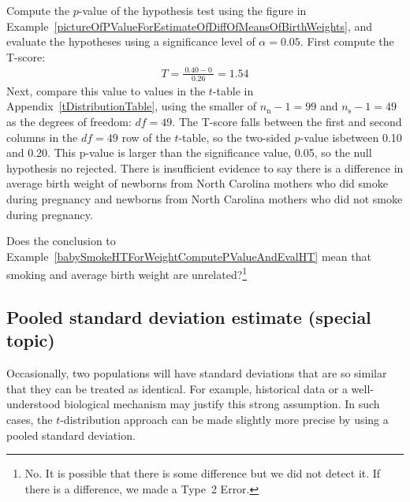\begin{example}{Compute the $p$-value of the hypothesis test using the figure in Example~\ref{pictureOfPValueForEstimateOfDiffOfMeansOfBirthWeights}, and evaluate the hypotheses using a significance level of $\alpha=0.05$.} \label{babySmokeHTForWeightComputePValueAndEvalHT}
First compute the T-score:
\begin{eqnarray*}
T = \frac{\ 0.40 - 0\ }{0.26} = 1.54
\end{eqnarray*}
Next, compare this value to values in the $t$-table in Appendix~\vref{tDistributionTable}, using the smaller of $n_{\text{n}} - 1 = 99$ and $n_{\text{s}} - 1 = 49$ as the degrees of freedom: $df = 49$. The T-score falls between the first and second columns in the $df = 49$ row of the $t$-table, so the two-sided $p$-value isbetween 0.10 and 0.20. This p-value is larger than the significance value, 0.05, so the null hypothesis no rejected. There is insufficient evidence to say there is a difference in average birth weight of newborns from North Carolina mothers who did smoke during pregnancy and newborns from North Carolina mothers who did not smoke during pregnancy.
\end{example}

\begin{exercise}
Does the conclusion to Example~\ref{babySmokeHTForWeightComputePValueAndEvalHT} mean that smoking and average birth weight are unrelated?\footnote{No. It is possible that there is some difference but we did not detect it. If there is a difference, we made a Type~2 Error.}
\end{exercise}

\subsection{Pooled standard deviation estimate (special topic)}
\label{pooledStandardDeviations}

Occasionally, two populations will have standard deviations that are so similar that they can be treated as identical. For example, historical data or a well-understood biological mechanism may justify this strong assumption. In such cases, the $t$-distribution approach can be made slightly more precise by using a pooled standard deviation.

